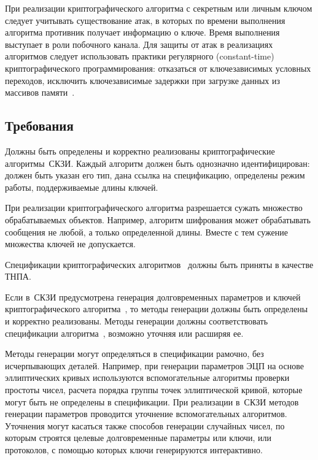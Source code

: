 При реализации криптографического алгоритма с секретным или личным ключом 
следует учитывать существование атак, в которых по времени выполнения алгоритма
противник получает информацию о ключе. Время выполнения выступает в роли 
побочного канала.
%
Для защиты от атак в реализациях алгоритмов следует использовать практики 
регулярного (constant-time) криптографического программирования: отказаться от 
ключезависимых условных переходов, исключить ключезависимые задержки при 
загрузке данных из массивов памяти~.

\subsection{Требования}\label{CS.Reqs}

\label{R.CS.Algs}
Должны быть определены и корректно реализованы криптографические алгоритмы~СКЗИ. 
%
Каждый алгоритм должен быть однозначно идентифицирован: должен быть указан его
тип, дана ссылка на спецификацию, определены режим работы, поддерживаемые длины
ключей.

\begin{note}
При реализации криптографического алгоритма разрешается сужать множество
обрабатываемых объектов. Например, алгоритм шифрования может обрабатывать
сообщения не любой, а только определенной длины. Вместе с тем сужение множества
ключей не допускается.
\end{note}

\label{R.CS.Std}
Спецификации криптографических алгоритмов~
должны быть приняты в качестве ТНПА.

\label{R.CS.Gen}
Если в~СКЗИ предусмотрена генерация долговременных параметров и ключей 
криптографического алгоритма~, то методы генерации 
должны быть определены и корректно реализованы.
%
Методы генерации должны соответствовать спецификации
алгоритма~, возможно уточняя или расширяя ее.

\begin{note}
Методы генерации могут определяться в спецификации рамочно, без исчерпывающих 
деталей.
%
Например, при генерации параметров ЭЦП на основе эллиптических кривых
используются вспомогательные алгоритмы проверки простоты чисел, расчета порядка
группы точек эллиптической кривой, которые могут быть не определены в спецификации.
%
При реализации в~СКЗИ методов генерации параметров проводится уточнение 
вспомогательных алгоритмов.
%
Уточнения могут касаться также способов генерации случайных чисел,
по которым строятся целевые долговременные параметры или ключи,
или протоколов, с помощью которых ключи генерируются интерактивно.
\end{note}

